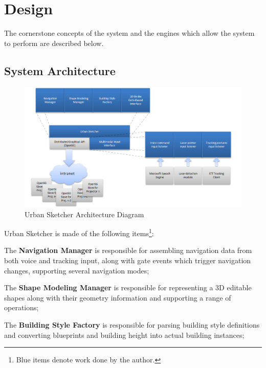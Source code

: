 \chapter{Design}


The cornerstone concepts of the system and the engines which allow the system to perform are described below.


\section{System Architecture}

\begin{figure}[!ht]
		\centering
		\includegraphics[width=16cm]{gfx/charts/block-diagram.png}
		\caption{Urban Sketcher Architecture Diagram}
		\label{fig:block-diagram}
\end{figure}


Urban Sketcher is made of the following items\footnote{Blue items denote work done by the author.}:

The \textbf{Navigation Manager} is
		responsible for assembling navigation data from
		both voice and tracking input, along with gate events which trigger navigation changes,
		supporting several navigation modes;
	
The \textbf{Shape Modeling Manager} is
		responsible for representing a 3D editable shapes
		along with their geometry information and supporting a range of operations;
	
The \textbf{Building Style Factory} is
		responsible for parsing building style definitions
		and converting blueprints and building height into actual building instances;
	
